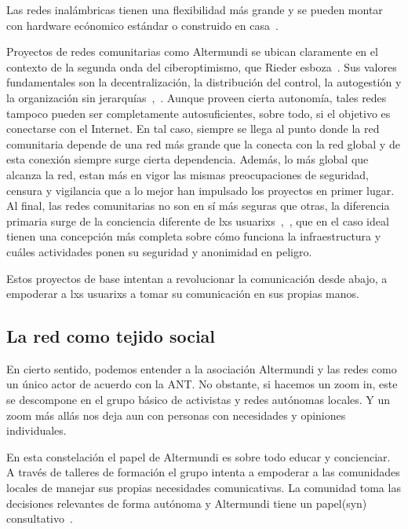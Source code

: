 Las redes inalámbricas tienen una flexibilidad más grande y se pueden montar con hardware ecónomico estándar o construido en casa~\autocite{Piccoli2015}.

Proyectos de redes comunitarias como Altermundi se ubican claramente en el contexto de la segunda onda del ciberoptimismo, que Rieder esboza~\autocite{Rieder2012}.
Sus valores fundamentales son la decentralización, la distribución del control, la autogestión y la organización sin jerarquías~\autocite{FiTre2015},~\autocite{Piccoli2015}.
Aunque proveen cierta autonomía, tales redes tampoco pueden ser completamente autosuficientes, sobre todo, si el objetivo es conectarse con el Internet.
En tal caso, siempre se llega al punto donde la red comunitaria depende de una red más grande que la conecta con la red global y de esta conexión siempre surge cierta dependencia.
Además, lo más global que alcanza la red, estan más en vigor las mismas preocupaciones de seguridad, censura y vigilancia que a lo mejor han impulsado los proyectos en primer lugar.
Al final, las redes comunitarias no son en sí más seguras que otras, la diferencia primaria surge de la conciencia diferente de lxs usuarixs~\autocite{Piccoli2015},~\autocite{FiTre2015}, que en el caso ideal tienen una concepción más completa sobre cómo funciona la infraestructura y cuáles actividades ponen su seguridad y anonimidad en peligro.

Estos proyectos de base intentan a revolucionar la comunicación desde abajo, a empoderar a lxs usuarixs a tomar su comunicación en sus propias manos. %

\subsection{La red como tejido social}

En cierto sentido, podemos entender a la asociación Altermundi y las redes como un único actor de acuerdo con la ANT.
No obstante, si hacemos un zoom in, este se descompone en el grupo básico de activistas y redes autónomas locales.
Y un zoom más allás nos deja aun con personas con necesidades y opiniones individuales.

En esta constelación el papel de Altermundi es sobre todo educar y concienciar.
A través de talleres de formación el grupo intenta a empoderar a las comunidades locales de manejar sus propias necesidades comunicativas.
La comunidad toma las decisiones relevantes de forma autónoma y Altermundi tiene un papel(syn) consultativo~\autocite{Vaseva2016a}.

